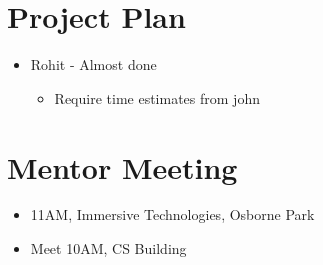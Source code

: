 
\date{5th September, 2011}
\apologies{-}
\absent{-}



\section{Project Plan}
\begin{itemize}
\item Rohit - Almost done
 \begin{itemize}
 \item Require time estimates from john
 \end{itemize}
\end{itemize}

\section{Mentor Meeting}
\begin{itemize}
\item 11AM, Immersive Technologies, Osborne Park
\item Meet 10AM, CS Building
\end{itemize}




